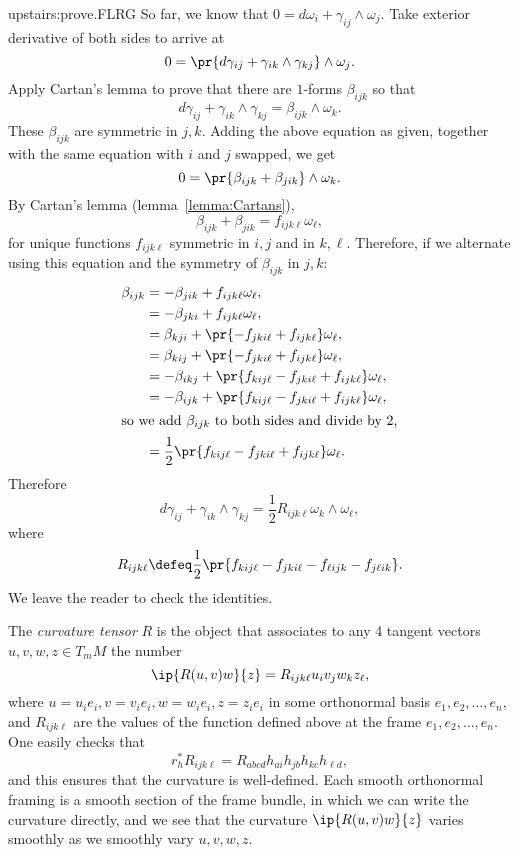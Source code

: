 \begin{answer}{upstairs:prove.FLRG}
So far, we know that \(0=d\omega_i + \gamma_{ij} \wedge \omega_j\).
Take exterior derivative of both sides to arrive at
\[
0 = \pr{d\gamma_{ij} + \gamma_{ik} \wedge \gamma_{kj}} \wedge \omega_j.
\]
Apply Cartan's lemma to prove that there are \(1\)-forms \(\beta_{ijk}\) so that
\[
d\gamma_{ij} + \gamma_{ik} \wedge \gamma_{kj} = \beta_{ijk} \wedge \omega_k.
\]
These \(\beta_{ijk}\) are symmetric in \(j,k\).
Adding the above equation as given, together with the same equation with \(i\) and \(j\) swapped, we get
\[
0 = \pr{\beta_{ijk} + \beta_{jik}} \wedge \omega_k.
\]
By Cartan's lemma (lemma~\vref{lemma:Cartans}), 
\[
\beta_{ijk}+\beta_{jik} = f_{ijk\ell} \omega_{\ell},
\]
for unique functions \(f_{ijk\ell}\) symmetric in \(i,j\) and in \(k,\ell\).
Therefore, if we alternate using this equation and the symmetry of \(\beta_{ijk}\) in \(j,k\):
\begin{align*}
\beta_{ijk}
&=
-\beta_{jik} + f_{ijk\ell} \omega_{\ell},
\\
&=
-\beta_{jki} + f_{ijk\ell} \omega_{\ell},
\\
&=
\beta_{kji} + \pr{-f_{jki\ell} + f_{ijk\ell}} \omega_{\ell},
\\
&=
\beta_{kij} + \pr{-f_{jki\ell} + f_{ijk\ell}} \omega_{\ell},
\\
&=
-\beta_{ikj} + \pr{f_{kij\ell}-f_{jki\ell} + f_{ijk\ell}} \omega_{\ell},
\\
&=
-\beta_{ijk} + \pr{f_{kij\ell}-f_{jki\ell} + f_{ijk\ell}} \omega_{\ell},
\\
\intertext{so we add \(\beta_{ijk}\) to both sides and divide by 2,}
&=
\frac{1}{2}\pr{f_{kij\ell}-f_{jki\ell} + f_{ijk\ell}} \omega_{\ell}.
\end{align*}
Therefore
\[
d\gamma_{ij} + \gamma_{ik} \wedge \gamma_{kj} =
\frac{1}{2} R_{ijk\ell} \omega_k \wedge \omega_{\ell},
\]
where
\[
R_{ijk\ell}\defeq \frac{1}{2} 
\pr{
f_{kij\ell}-f_{jki\ell}
-
f_{\ell ijk}-f_{j\ell ik}
}.
\]
We leave the reader to check the identities.
\end{answer} 
The \emph{curvature tensor} \(R\) is the object that associates to any 4 tangent vectors \(u,v,w,z \in T_m M\) the number
\[
\ip{R(u,v)w}{z} = R_{ijk\ell} u_i v_j w_k z_{\ell},
\]
where \(u=u_i e_i, v=v_i e_i, w=w_i e_i, z=z_i e_i\) in some orthonormal basis \(e_1, e_2, \dots, e_n\), and \(R_{ijk\ell}\) are the values of the function defined above at the frame \(e_1, e_2, \dots, e_n\).
One easily checks that
\[
r_h^* R_{ijk\ell} = R_{abcd} h_{ai} h_{jb} h_{kc} h_{\ell d},
\]
and this ensures that the curvature is well-defined.
Each smooth orthonormal framing is a smooth section of the frame bundle, in which we can write the curvature directly, and we see that the curvature \(\ip{R(u,v)w}{z}\) varies smoothly as we smoothly vary \(u,v,w,z\).


